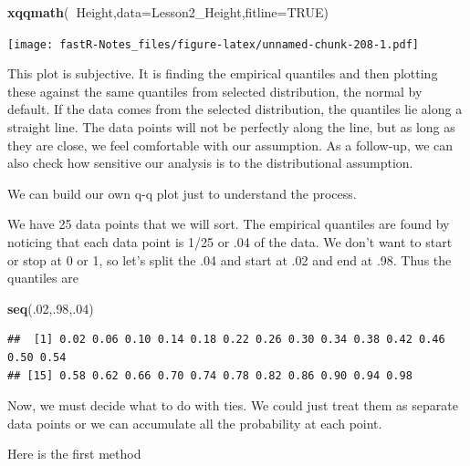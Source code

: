 \documentclass[]{book}
\newenvironment{Shaded}{\begin{snugshade}}{\end{snugshade}}
\newcommand{\KeywordTok}[1]{\textcolor[rgb]{0.13,0.29,0.53}{\textbf{#1}}}
\newcommand{\DataTypeTok}[1]{\textcolor[rgb]{0.13,0.29,0.53}{#1}}
\newcommand{\DecValTok}[1]{\textcolor[rgb]{0.00,0.00,0.81}{#1}}
\newcommand{\StringTok}[1]{\textcolor[rgb]{0.31,0.60,0.02}{#1}}
\newcommand{\OtherTok}[1]{\textcolor[rgb]{0.56,0.35,0.01}{#1}}
\newcommand{\OperatorTok}[1]{\textcolor[rgb]{0.81,0.36,0.00}{\textbf{#1}}}
\newcommand{\NormalTok}[1]{#1}
\theoremstyle{definition}
\theoremstyle{definition}
\theoremstyle{definition}
\theoremstyle{remark}
\begin{document}
\begin{Shaded}
\begin{Highlighting}[]
\KeywordTok{xqqmath}\NormalTok{(}\OperatorTok{~}\NormalTok{Height,}\DataTypeTok{data=}\NormalTok{Lesson2_Height,}\DataTypeTok{fitline=}\OtherTok{TRUE}\NormalTok{)}
\end{Highlighting}
\end{Shaded}

\texttt{[image: fastR-Notes\_files/figure-latex/unnamed-chunk-208-1.pdf]}

This plot is subjective. It is finding the empirical quantiles and then
plotting these against the same quantiles from selected distribution,
the normal by default. If the data comes from the selected distribution,
the quantiles lie along a straight line. The data points will not be
perfectly along the line, but as long as they are close, we feel
comfortable with our assumption. As a follow-up, we can also check how
sensitive our analysis is to the distributional assumption.

We can build our own q-q plot just to understand the process.

We have 25 data points that we will sort. The empirical quantiles are
found by noticing that each data point is 1/25 or .04 of the data. We
don't want to start or stop at 0 or 1, so let's split the .04 and start
at .02 and end at .98. Thus the quantiles are

\begin{Shaded}
\begin{Highlighting}[]
 \KeywordTok{seq}\NormalTok{(.}\DecValTok{02}\NormalTok{,.}\DecValTok{98}\NormalTok{,.}\DecValTok{04}\NormalTok{)}
\end{Highlighting}
\end{Shaded}

\begin{verbatim}
##  [1] 0.02 0.06 0.10 0.14 0.18 0.22 0.26 0.30 0.34 0.38 0.42 0.46 0.50 0.54
## [15] 0.58 0.62 0.66 0.70 0.74 0.78 0.82 0.86 0.90 0.94 0.98
\end{verbatim}

Now, we must decide what to do with ties. We could just treat them as
separate data points or we can accumulate all the probability at each
point.

Here is the first method

\begin{Shaded}
\end{Shaded}
\end{document}
